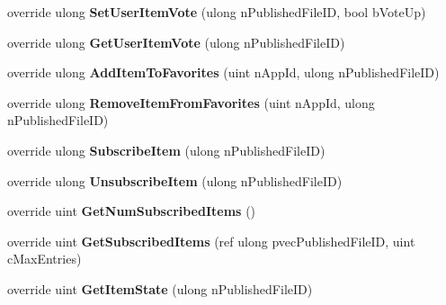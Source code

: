 \begin{DoxyCompactItemize}
override ulong {\bfseries Set\+User\+Item\+Vote} (ulong n\+Published\+File\+ID, bool b\+Vote\+Up)
\item 
\mbox{\label{class_valve_1_1_steamworks_1_1_c_steam_u_g_c_a2f0960e536afdc853822b2a04fce7165}} 
override ulong {\bfseries Get\+User\+Item\+Vote} (ulong n\+Published\+File\+ID)
\item 
\mbox{\label{class_valve_1_1_steamworks_1_1_c_steam_u_g_c_aa15109e48e5a9d967f6a78d032ce9922}} 
override ulong {\bfseries Add\+Item\+To\+Favorites} (uint n\+App\+Id, ulong n\+Published\+File\+ID)
\item 
\mbox{\label{class_valve_1_1_steamworks_1_1_c_steam_u_g_c_a97b9d0671dcb5c3656e5cfa9bc0b5e44}} 
override ulong {\bfseries Remove\+Item\+From\+Favorites} (uint n\+App\+Id, ulong n\+Published\+File\+ID)
\item 
\mbox{\label{class_valve_1_1_steamworks_1_1_c_steam_u_g_c_ab1f85f478d3b82e51e6d2fe76276758a}} 
override ulong {\bfseries Subscribe\+Item} (ulong n\+Published\+File\+ID)
\item 
\mbox{\label{class_valve_1_1_steamworks_1_1_c_steam_u_g_c_abfd8793bc8da34926642b9bef49fb1f4}} 
override ulong {\bfseries Unsubscribe\+Item} (ulong n\+Published\+File\+ID)
\item 
\mbox{\label{class_valve_1_1_steamworks_1_1_c_steam_u_g_c_af2ded6182d558b070dda2a1b373372ce}} 
override uint {\bfseries Get\+Num\+Subscribed\+Items} ()
\item 
\mbox{\label{class_valve_1_1_steamworks_1_1_c_steam_u_g_c_ac988522afdee36d9497e944f5797a529}} 
override uint {\bfseries Get\+Subscribed\+Items} (ref ulong pvec\+Published\+File\+ID, uint c\+Max\+Entries)
\item 
\mbox{\label{class_valve_1_1_steamworks_1_1_c_steam_u_g_c_aa3f2b7f435f170c6f6d52bae425be979}} 
override uint {\bfseries Get\+Item\+State} (ulong n\+Published\+File\+ID)

\end{DoxyCompactItemize}
